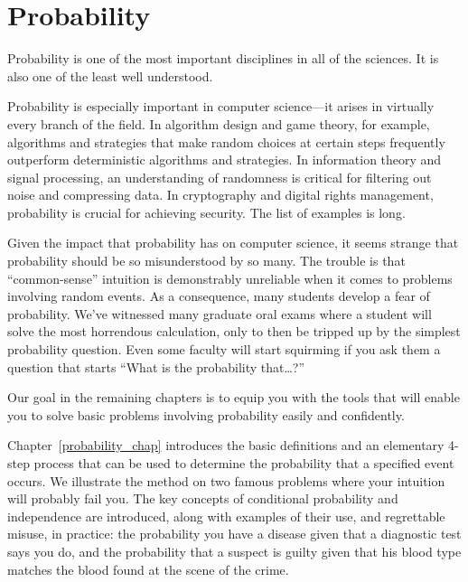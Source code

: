 \part{Probability}
\label{part:probability}

\partintro
{}

Probability is one of the most important disciplines in all of the
sciences.  It is also one of the least well understood.

Probability is especially important in computer science---it arises in
virtually every branch of the field.  In algorithm design and game
theory, for example, algorithms and strategies \iffalse (that use a
random number generator as a key input for decision making)\fi that
make random choices at certain steps frequently outperform
deterministic algorithms and strategies.  In information theory and
signal processing, an understanding of randomness is critical for
filtering out noise and compressing data.  In cryptography and digital
rights management, probability is crucial for achieving security.  The
list of examples is long.

Given the impact that probability has on computer science, it seems
strange that probability should be so misunderstood by so many.  The
trouble is that ``common-sense'' intuition is demonstrably unreliable
when it comes to problems involving random events.  As a consequence,
many students develop a fear of probability.  We've witnessed many
graduate oral exams where a student will solve the most horrendous
calculation, only to then be tripped up by the simplest probability
question.  Even some faculty will start squirming if you ask
them a question that starts ``What is the probability that\dots?''

Our goal in the remaining chapters is to equip you with the tools that
will enable you to solve basic problems involving probability easily
and confidently.

Chapter~\ref{probability_chap} introduces the basic definitions and an
elementary 4-step process that can be used to determine the
probability that a specified event occurs.  We illustrate the method
on two famous problems where your intuition will probably fail you.
The key concepts of conditional probability and independence are
introduced, along with examples of their use, and regrettable misuse,
in practice: the probability you have a disease given that a
diagnostic test says you do, and the probability that a suspect is
guilty given that his blood type matches the blood found at the scene
of the crime.

